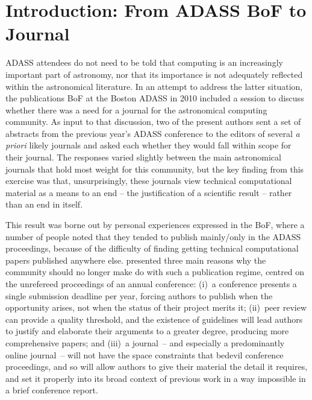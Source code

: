 \section{Introduction: From ADASS BoF to Journal}

ADASS attendees do not need to be told that computing is an increasingly important part of astronomy, nor that its importance is not adequately reflected within the astronomical literature. In an attempt to address the latter situation, the publications BoF at the Boston ADASS in 2010 included a session to discuss whether there was a need for a journal for the astronomical computing community. As input to that discussion, two of the present authors sent a set of abstracts from the previous year's ADASS conference to the editors of several {\em a priori\/} likely journals and asked each whether they would fall within scope for their journal. The responses \citep[summarised by][]{graymann} varied slightly between the main astronomical journals that hold most weight for this community, but the key finding from this exercise was that, unsurprisingly, these journals view technical computational material as a means to an end -- the justification of a scientific result -- rather than an end in itself. 

This result was borne out by personal experiences expressed in the BoF, where a number of people noted that they tended to publish mainly/only in the ADASS proceedings, because of the difficulty of finding getting technical computational papers published anywhere else. \cite{graymann} presented three main reasons why the community should no longer make do  with such a publication regime, centred on the unrefereed proceedings of an annual conference: (i)~a conference presents a single submission deadline per year, forcing authors to publish when the opportunity arises, not when the status of their project merits it; (ii)~peer review can provide a quality threshold, and the existence of guidelines will lead authors to justify and elaborate their arguments to a greater degree, producing more comprehensive papers; and (iii)~a journal~-- and especially a predominantly online journal~-- will not have the space constraints that bedevil conference proceedings, and so will allow authors to give their material the detail it requires, and set it properly into its broad context of previous work in a way impossible in a brief conference report.

